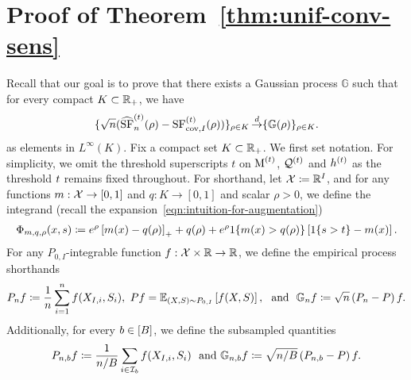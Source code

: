 \section{Proof of Theorem~\ref{thm:unif-conv-sens}}
\label{proof-thm-unif-conv-sens}

Recall that our goal is to prove that
there exists a Gaussian process $\mathbb{G}$ such that
for every compact $K \subset \mathbb{R}_+$, we have
\begin{equation}
  \label{goal:uniform-convergence}
  \{ \sqrt{n}(\widehat{\operatorname*{SF}}^{(t)}_n(\rho)- {\operatorname*{SF}}_{\textup{cov}, I}^{(t)}(\rho)) \}_{\rho \in K}
  \mathop{\stackrel{d}{\rightarrow}} \{\mathbb{G}(\rho)\}_{\rho \in K}.
\end{equation}
as elements in $L^\infty(K)$. Fix a compact set $K \subset \mathbb{R}_+$.  We first
set notation.  For simplicity, we omit the threshold superscripts $t$ on
$\operatorname*{M}^{(t)}$, $\mathcal{Q}^{(t)}$ and
$h^{(t)}$ as the threshold $t$ remains fixed
throughout.  For shorthand, let $\mathcal{X} \coloneqq \mathbb{R}^I$, and for any functions
$m : \mathcal{X} \to [0,1]$ and $q : K \to [0,1]$ and scalar $\rho>0$, we define
the integrand (recall the expansion~\eqref{eqn:intuition-for-augmentation})
\begin{align*}
  \Phi_{m, q, \rho} (x,  s) \coloneqq e^\rho \left[{m(x) - q(\rho)}\right]_+
  + q(\rho) + e^\rho 1\!\left\{ m(x) > q(\rho)\right\} \left[ 1\!\left\{s > t\right\}
    - m(x) \right].
\end{align*}
For any $P_{0,I}$-integrable function $f : \mathcal{X} \times \mathbb{R} \to \mathbb{R}$, we
define the empirical process shorthands
\begin{align*}
  P_n f \coloneqq \frac{1}{n} \sum_{i=1}^n f(X_{I,i}, S_i), ~ P f = \mathbb{E}_{(X,S) \sim P_{0,I}} \left[ f(X,S) \right],  ~ \text{ and } ~ \mathbb{G}_n f \coloneqq \sqrt{n} \left( P_n - P \right) f.
\end{align*}
Additionally, for every $b \in [B]$, we
define the subsampled quantities
\begin{align*}
  P_{n,b} f \coloneqq \frac{1}{n/B} \sum_{i \in \mathcal{I}_b} f(X_{I,i}, S_i) ~ \text{ and } \mathbb{G}_{n,b}f \coloneqq \sqrt{n/B} \left(P_{n,b} - P \right) f.
\end{align*}

